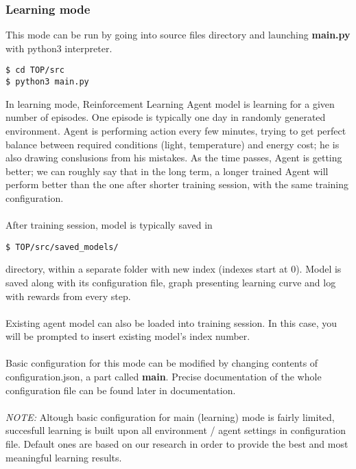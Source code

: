 \documentclass{article}
\begin{document}
\subsubsection{Learning mode}
This mode can be run by going into source files directory and launching \textbf{main.py}
 with python3 interpreter. 
\begin{lstlisting}
$ cd TOP/src
$ python3 main.py
\end{lstlisting}
In learning mode, Reinforcement Learning Agent model is learning for a given number of episodes.
One episode is typically one day in randomly generated environment. Agent is performing action every few minutes, trying to get perfect balance between required conditions (light, temperature) and energy cost; he is also drawing conslusions from his mistakes. As the time passes, Agent is getting better; we can roughly say
that in the long term, a longer trained Agent will perform better than the one after shorter training session,
with the same training configuration.
\\\\
After training session, model is typically saved in
\begin{lstlisting}
$ TOP/src/saved_models/
\end{lstlisting}
directory, within a separate folder with new index (indexes start at 0). Model is saved along with its configuration file, graph presenting learning curve and log with rewards from 
every step.
\\\\
Existing agent model can also be loaded into training session. In this case, you will be prompted
to insert existing model's index number.
\\\\ Basic configuration for this mode can be modified by changing contents of configuration.json, a part
called \textbf{main}. Precise documentation of the whole configuration file can be found later in documentation. 
\\\\
\textit{NOTE:} Altough basic configuration for main (learning) mode is fairly limited, succesfull learning is built upon all environment / agent settings in configuration file. Default ones are based on our research in order to provide the best and most meaningful learning results.
\end{document}
